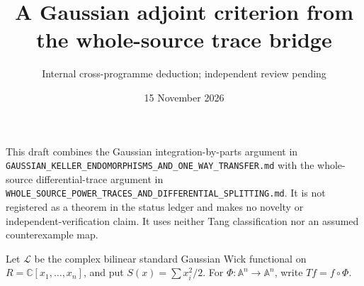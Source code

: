 \documentclass[11pt]{article}
\title{A Gaussian adjoint criterion from the whole-source trace bridge}
\author{Internal cross-programme deduction; independent review pending}
\date{15 November 2026}
\begin{document}
\maketitle
This draft combines the Gaussian integration-by-parts argument in
\texttt{GAUSSIAN\_KELLER\_ENDOMORPHISMS\_AND\_ONE\_WAY\_TRANSFER.md}
with the whole-source differential-trace argument in
\texttt{WHOLE\_SOURCE\_POWER\_TRACES\_AND\_DIFFERENTIAL\_SPLITTING.md}.
It is not registered as a theorem in the status ledger and makes no novelty
or independent-verification claim. It uses neither Tang classification nor
an assumed counterexample map.

Let $\mathcal L$ be the complex bilinear standard Gaussian Wick functional
on $R=\mathbb C[x_1,\ldots,x_n]$, and put $S(x)=\sum x_i^2/2$.
For $\Phi:\mathbb A^n\to\mathbb A^n$, write $Tf=f\circ\Phi$.
\end{document}
